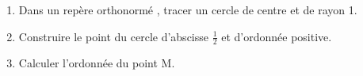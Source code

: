 
\begin{enumerate}
\item Dans un repère orthonormé \Oij, tracer un cercle de centre  et de rayon 1.
\item  Construire le point du cercle d'abscisse $\frac{1}{2}$ et d'ordonnée positive.
\item  Calculer l'ordonnée du point M. 
\end{enumerate}